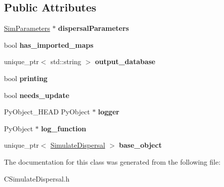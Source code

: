 \subsection*{Public Attributes}
\begin{DoxyCompactItemize}
\item 
\hyperlink{struct_sim_parameters}{Sim\+Parameters} $\ast$ {\bfseries dispersal\+Parameters}\hypertarget{class_py_simulate_dispersal_a81fba3af1dfd1a32f2e8f543ab8ddae6}{}\label{class_py_simulate_dispersal_a81fba3af1dfd1a32f2e8f543ab8ddae6}

\item 
bool {\bfseries has\+\_\+imported\+\_\+maps}\hypertarget{class_py_simulate_dispersal_a5594ed1200643d899b5eb2541488217a}{}\label{class_py_simulate_dispersal_a5594ed1200643d899b5eb2541488217a}

\item 
unique\+\_\+ptr$<$ std\+::string $>$ {\bfseries output\+\_\+database}\hypertarget{class_py_simulate_dispersal_a2f792e38bcb2cebf921cb001d6058108}{}\label{class_py_simulate_dispersal_a2f792e38bcb2cebf921cb001d6058108}

\item 
bool {\bfseries printing}\hypertarget{class_py_simulate_dispersal_a95ccf647e55688481b7a9daaaa1f99b8}{}\label{class_py_simulate_dispersal_a95ccf647e55688481b7a9daaaa1f99b8}

\item 
bool {\bfseries needs\+\_\+update}\hypertarget{class_py_simulate_dispersal_af344386936e2e70b17d44351f63d2af9}{}\label{class_py_simulate_dispersal_af344386936e2e70b17d44351f63d2af9}

\item 
Py\+Object\+\_\+\+H\+E\+AD Py\+Object $\ast$ {\bfseries logger}\hypertarget{class_py_template_a5b741a472639d65f9bcad29afa16ec99}{}\label{class_py_template_a5b741a472639d65f9bcad29afa16ec99}

\item 
Py\+Object $\ast$ {\bfseries log\+\_\+function}\hypertarget{class_py_template_a98bb8152faa73d028342d5cf260f0372}{}\label{class_py_template_a98bb8152faa73d028342d5cf260f0372}

\item 
unique\+\_\+ptr$<$ \hyperlink{class_simulate_dispersal}{Simulate\+Dispersal} $>$ {\bfseries base\+\_\+object}\hypertarget{class_py_template_a14da655e6d3c0b398d8478058316d326}{}\label{class_py_template_a14da655e6d3c0b398d8478058316d326}

\end{DoxyCompactItemize}


The documentation for this class was generated from the following file\+:\begin{DoxyCompactItemize}
\item 
C\+Simulate\+Dispersal.\+h\end{DoxyCompactItemize}
